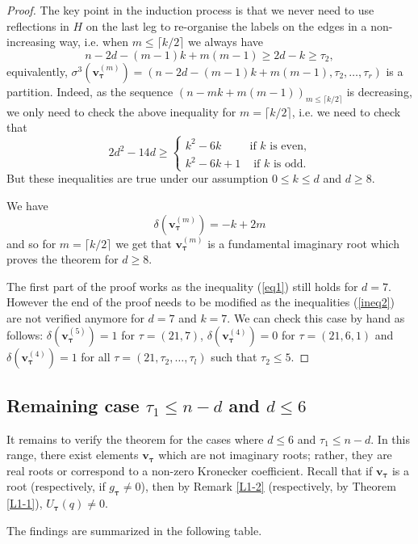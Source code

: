 \documentclass[11pt]{article}
\theoremstyle{definition}
\numberwithin{equation}{section}
\newcommand{\bv}{{\mathbf{v}}}
\newcommand{\tauhat}{{\boldsymbol \tau}}
\begin{document}
\begin{proof}
	
	The key point in the induction process is that we never need to use reflections in $H$ on the last leg to re-organise the labels on the edges in a non-increasing way, i.e. when $m\leq\lceil k/2\rceil$ we always have
	$$
	n-2d-(m-1)k+m(m-1)\geq 2d-k\geq \tau_2,
	$$
	equivalently, $\sigma^3(\bv^{(m)}_\tauhat)=(n-2d-(m-1)k+m(m-1),\tau_2, \ldots , \tau_r)$ is a partition.
	Indeed, as the sequence $(n-mk+m(m-1))_{m\leq\lceil k/2\rceil}$ is decreasing, we only need to check the above inequality for $m=\lceil k/2\rceil$, i.e. we need to check that
	\begin{equation}
		2d^2-14d\geq\begin{cases}k^2-6k &\text{if } k\text{ is even,}\\k^2-6k+1&\text{ if } k\text{ is odd.}\end{cases}
		\label{ineq2}\end{equation}
	But these inequalities are true under our assumption $0\leq k\leq d$ and $d\geq 8$.
	
	We have
	$$
	\delta(\bv_\tauhat^{(m)})=-k+2m
	$$
	and so for $m=\lceil k/2\rceil$ we get that $\bv^{(m)}_\tauhat$ is a fundamental imaginary root which proves the theorem for $d\geq 8$.
	
	
	The first part of the proof works as the inequality (\ref{eq1}) still holds for $d=7$. However the end of the proof needs to be modified as the inequalities (\ref{ineq2}) are not verified anymore for $d=7$ and $k=7$. We can check this case by hand as follows: $\delta(\bv_\tauhat^{(5)})=1$ for $\tau=(21,7)$, $\delta(\bv_\tauhat^{(4)})=0$ for $\tau=(21,6,1)$ and $\delta(\bv_\tauhat^{(4)})=1$ for all $\tau=(21,\tau_2,\ldots , \tau_l)$ such that $\tau_2 \leq 5$.
\end{proof}

\subsection{Remaining case \texorpdfstring{$\tau_1\leq n-d$ and $d \leq 6$}{tau\_1 ≤ n-d and d ≤ 6}}
It remains to verify the theorem for the cases where $d\leq 6$ and $\tau_1 \leq n-d$.
In this range, there exist elements $\bv_\tauhat$ 
which are not imaginary roots; rather, they are real roots or correspond to a non-zero Kronecker coefficient. Recall that if $\bv_\tauhat$  is a root (respectively, if $g_\tauhat\neq 0$), then by Remark \ref{L1-2} (respectively, by Theorem \ref{L1-1}), $U_\tauhat(q)\neq 0$.


The findings are summarized in the following table.
\end{document}
